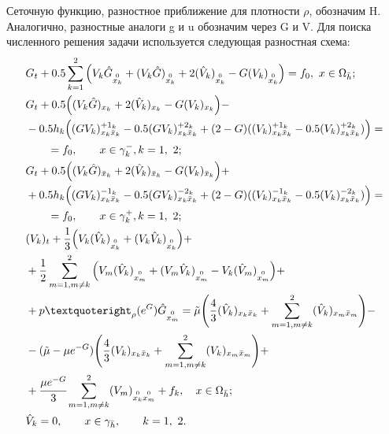 Сеточную функцию, разностное приближение для плотности $\rho$, обозначим H. Аналогично, разностные аналоги g и u обозначим через G и V. Для поиска численного решения задачи используется следующая разностная схема:
\begin{align*}
& G_t + 0.5 \sum_{k=1}^{2}\Big(V_k \hat G_{\stackrel{0}{x_k}} + (V_k \hat G)_{\stackrel{0}{x_k}} 
  + 2 (\hat V_k)_{\stackrel{0}{x_k}} - G(V_k)_{\stackrel{0}{x_k}} \Big) = f_0,\ x \in \Omega _{\bar h};\\
& G_t + 0.5 \Big((V_k \hat G)_{x_k} + 2 (\hat V_k)_{x_k} - G(V_k)_{x_k}\Big) -\\
& -0.5h_k \Big( (GV_k)_{x_k\bar x_k}^{+1_k} - 0.5(GV_k)_{x_k\bar x_k}^{+2_k}
  + (2-G)((V_k)_{x_k\bar x_k}^{+1_k} - 0.5 (V_k)_{x_k\bar x_k}^{+2_k})\Big) = \\
& \qquad = f_0, \qquad x \in \gamma_k^-, k = 1,\ 2;\\
& G_t + 0.5 \Big((V_k \hat G)_{\bar x_k} + 2 (\hat V_k)_{\bar x_k} - G(V_k)_{\bar x_k}\Big) +\\
& + 0.5h_k \Big( (GV_k)_{x_k\bar x_k}^{-1_k} - 0.5(GV_k)_{x_k\bar x_k}^{-2_k}
  + (2-G)((V_k)_{x_k\bar x_k}^{-1_k} - 0.5 (V_k)_{x_k\bar x_k}^{-2_k})\Big) = \\
& \qquad = f_0, \qquad x \in \gamma_k^+, k = 1,\ 2;\\
& (V_k)_t + \frac{1}{3}\Big( V_k(\hat V_k)_{\stackrel{0}{x_k}} + (V_k \hat V_k)_{\stackrel{0}{x_k}} \Big) +\\
& + \frac{1}{2}\sum_{m=1,m\neq k}^{2}\Big( 
  V_m(\hat V_k)_{\stackrel{0}{x_m}} + (V_m \hat V_k)_{\stackrel{0}{x_m}} - V_k(\hat V_m)_{\stackrel{0}{x_m}} \Big) +\\
& + p’_{\rho }(e^{G})\hat G_{\stackrel{0}{x_m}} = \tilde{\mu} \Bigg( \frac{4}{3}(\hat V_k)_{x_k\bar x_k}
  + \sum_{m=1,m\neq k}^{2}(\hat V_k)_{x_m\bar x_m} \Bigg) -\\
& - (\tilde{\mu} - \mu e^{-G}) \Bigg( \frac{4}{3}(V_k)_{x_k\bar x_k} + \sum_{m=1,m\neq k}^{2}(V_k)_{x_m\bar x_m}
  \Bigg) +\\
& + \cfrac{\mu e^{-G}}{3} \sum_{m=1,m\neq k}^{2}(V_m)_{\stackrel{0}{x_k} \stackrel{0}{x_m}} + f_k,\quad x\in \Omega_{\bar h};\\
& \hat V_k = 0, \qquad x \in \gamma_{\bar h}, \qquad k = 1,\ 2.
\end{align*}

